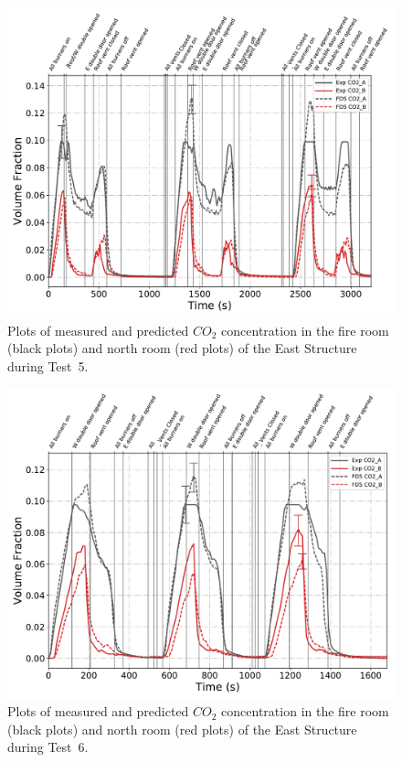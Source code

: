 \begin{figure}[!h]
	\centering
	\includegraphics[width=\columnwidth]{Figures/Plots/Validation/Gas_Concentration/Test_5_CO2}
	\caption[Plots of measured and predicted $CO_2$ concentration during Test~5.]{Plots of measured and predicted $CO_2$ concentration in the fire room (black plots) and north room (red plots) of the East Structure during Test~5.}
	\label{fig:Test5_CO2}
\end{figure}

\begin{figure}[!h]
	\centering
	\includegraphics[width=\columnwidth]{Figures/Plots/Validation/Gas_Concentration/Test_6_CO2}
	\caption[Plots of measured and predicted $CO_2$ concentration during Test~6.]{Plots of measured and predicted $CO_2$ concentration in the fire room (black plots) and north room (red plots) of the East Structure during Test~6.}
	\label{fig:Test6_CO2}
\end{figure}

